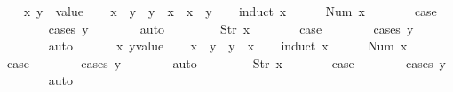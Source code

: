 \begin{isabellebody}
\isanewline
{}\isamarkupfalse%
\isanewline
\ \ \isamarkupfalse%
\ x\ y\ {\isacharcolon}{\isacharcolon}\ {\isachardoublequoteopen}value{\isachardoublequoteclose}\isanewline
\ \ \isamarkupfalse%
\ {\isachardoublequoteopen}x\ {\isasymle}\ y\ {\isasymLongrightarrow}\ y\ {\isasymle}\ x\ {\isasymLongrightarrow}\ x\ {\isacharequal}\ y{\isachardoublequoteclose}\isanewline
\ \ \isamarkupfalse%
\ {\isacharparenleft}induct\ x{\isacharparenright}\isanewline
\ \ \ \ \isamarkupfalse%
\ {\isacharparenleft}Num\ x{\isacharparenright}\isanewline
\ \ \ \ \isamarkupfalse%
\ \isamarkupfalse%
\ {\isacharquery}case\isanewline
\ \ \ \ \ \ \isamarkupfalse%
\ {\isacharparenleft}cases\ y{\isacharparenright}\isanewline
\ \ \ \ \ \ \isamarkupfalse%
\ auto\isanewline
\ \ \isamarkupfalse%
\isanewline
\ \ \ \ \isamarkupfalse%
\ {\isacharparenleft}Str\ x{\isacharparenright}\isanewline
\ \ \ \ \isamarkupfalse%
\ \isamarkupfalse%
\ {\isacharquery}case\isanewline
\ \ \ \ \ \ \isamarkupfalse%
\ {\isacharparenleft}cases\ y{\isacharparenright}\isanewline
\ \ \ \ \ \ \isamarkupfalse%
\ auto\isanewline
\ \ \isamarkupfalse%
\isanewline
{}\isamarkupfalse%
\isanewline
\ \ \isamarkupfalse%
\ x\ y{\isacharcolon}{\isacharcolon}{\isachardoublequoteopen}value{\isachardoublequoteclose}\isanewline
\ \ \isamarkupfalse%
\ {\isachardoublequoteopen}x\ {\isasymle}\ y\ {\isasymor}\ y\ {\isasymle}\ x{\isachardoublequoteclose}\isanewline
\ \ \isamarkupfalse%
\ {\isacharparenleft}induct\ x{\isacharparenright}\isanewline
\ \ \ \ \isamarkupfalse%
\ {\isacharparenleft}Num\ x{\isacharparenright}\isanewline
\ \ \ \ \isamarkupfalse%
\ \isamarkupfalse%
\ {\isacharquery}case\isanewline
\ \ \ \ \ \ \isamarkupfalse%
\ {\isacharparenleft}cases\ y{\isacharparenright}\isanewline
\ \ \ \ \ \ \isamarkupfalse%
\ auto\isanewline
\ \ \isamarkupfalse%
\isanewline
\ \ \ \ \isamarkupfalse%
\ {\isacharparenleft}Str\ x{\isacharparenright}\isanewline
\ \ \ \ \isamarkupfalse%
\ \isamarkupfalse%
\ {\isacharquery}case\isanewline
\ \ \ \ \ \ \isamarkupfalse%
\ {\isacharparenleft}cases\ y{\isacharparenright}\isanewline
\ \ \ \ \ \ \isamarkupfalse%
\ auto\isanewline
\ \ \isamarkupfalse%
\isanewline
{}\isamarkupfalse%
%
\endisatagproof
{\isafoldproof}%
%
\isadelimproof
%
\endisadelimproof
\isanewline
{}\isamarkupfalse%
\isanewline
%
\isadelimtheory
\isanewline
%
\endisadelimtheory
%
\isatagtheory
{}\isamarkupfalse%
%
\endisatagtheory
{\isafoldtheory}%
%
\isadelimtheory
%
\endisadelimtheory
%
\end{isabellebody}%
